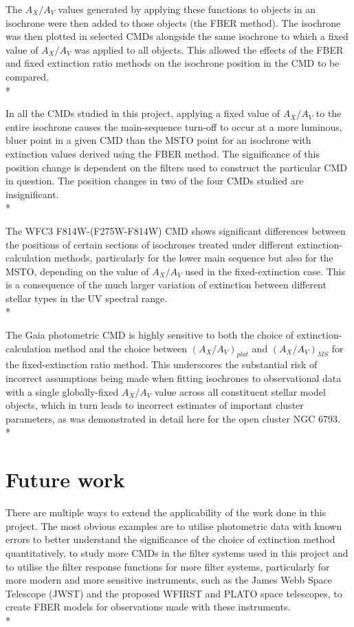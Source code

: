 \documentclass[12pt, a4paper]{report}
\begin{document}
The $A_{X}/A_{V}$ values generated by applying these functions to objects in an isochrone were then added to those objects (the FBER method). The isochrone was then plotted in selected CMDs alongside the same isochrone to which a fixed value of $A_{X}/A_{V}$ was applied to all objects. This allowed the effects of the FBER and fixed extinction ratio methods on the isochrone position in the CMD to be compared. \\*

In all the CMDs studied in this project, applying a fixed value of $A_{X}/A_{V}$ to the entire isochrone causes the main-sequence turn-off to occur at a more luminous, bluer point in a given CMD than the MSTO point for an isochrone with extinction values derived using the FBER method. The significance of this position change is dependent on the filters used to construct the particular CMD in question. The position changes in two of the four CMDs studied are insignificant.\\*

The WFC3 F814W-(F275W-F814W) CMD shows significant differences between the positions of certain sections of isochrones treated under different extinction-calculation methods, particularly for the lower main sequence but also for the MSTO, depending on the value of $A_{X}/A_{V}$ used in the fixed-extinction case. This is a consequence of the much larger variation of extinction between different stellar types in the UV spectral range.\\*

The Gaia photometric CMD is highly sensitive to both the choice of extinction-calculation method and the choice between $(A_{X}/A_{V})_{plat}$ and $(A_{X}/A_{V})_{MS}$ for the fixed-extinction ratio method. This underscores the substantial risk of incorrect assumptions being made when fitting isochrones to observational data with a single globally-fixed $A_{X}/A_{V}$ value across all constituent stellar model objects, which in turn leads to incorrect estimates of important cluster parameters, as was demonstrated in detail here for the open cluster NGC 6793. \\*

\section{Future work}
There are multiple ways to extend the applicability of the work done in this project. The most obvious examples are to utilise photometric data with known errors to better understand the significance of the choice of extinction method quantitatively, to study more CMDs in the filter systems used in this project and to utilise the filter response functions for more filter systems, particularly for more modern and more sensitive instruments, such as the James Webb Space Telescope (JWST) and the proposed WFIRST and PLATO space telescopes, to create FBER models for observations made with these instruments.\\*
\end{document}
